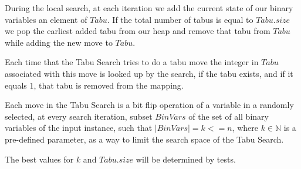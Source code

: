 During the local search, at each iteration we add the current state of our binary variables an element of $Tabu$. If the total number of tabus is equal to $Tabu.size$ we pop the earliest added tabu from our heap and remove that tabu from $Tabu$ while adding the new move to $Tabu$.

Each time that the Tabu Search tries to do a tabu move the integer in $Tabu$ associated with this move is looked up by the search, if the tabu exists, and if it equals $1$, that tabu is removed from the mapping.

Each move in the Tabu Search is a bit flip operation of a variable in a randomly selected, at every search iteration, subset $BinVars$ of the set of all binary variables of the input instance, such that $|BinVars| = k <= n$, where $k \in \mathbb{N}$ is a pre-defined parameter, as a way to limit the search space of the Tabu Search.

The best values for $k$ and $Tabu.size$ will be determined by tests.
